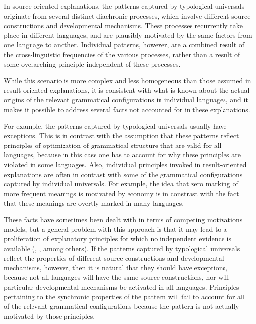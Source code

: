 \documentclass[output=paper]{langsci/langscibook}
\begin{document}
In source-oriented explanations,  the patterns
captured by typological universals originate from several distinct diachronic processes, which involve
different source constructions and developmental mechanisms. These
processes recurrently take place in different languages, and are
plausibly motivated by the same factors from one language to another. Individual patterns, however, are a combined
result of the cross-linguistic frequencies of the various processes, rather than a result
of some 
overarching principle independent of these processes.

While
this scenario is 
more complex and less homogeneous than those assumed in result-oriented explanations, it is consistent with what is known about the actual origins of
the relevant grammatical configurations in individual languages, and it
makes it possible to address several facts  not accounted for in
these explanations. 

For example, the patterns captured by typological universals usually
have exceptions. This is
in contrast with the assumption that these patterns reflect principles of optimization of
grammatical structure that are valid for all languages, because in
this case one has to account for why these principles are violated in
some languages. Also, individual principles invoked in result-oriented
explanations are often in contrast with some of the
grammatical configurations captured by individual universals. For
example, the idea that zero marking of more frequent meanings is
motivated by economy is in constrast with the fact that these meanings
are overtly marked in many languages. 

These facts have sometimes been
dealt with in terms of competing motivations models, but a general
problem with this approach is that it may lead to a
proliferation of explanatory principles for which no independent
evidence is available (, \citealt{Otacompetingmotivations}, among
others). If the patterns captured by typological universals reflect the properties of different
source constructions and developmental mechanisms, however,  then it is
natural that they should have exceptions, because not all
languages will have the same source constructions, nor will
particular developmental mechanisms be activated in all
languages. Principles pertaining to the synchronic properties of the
pattern will fail to account for all of the relevant grammatical
configurations because the pattern is not actually motivated by those principles.
\end{document}
